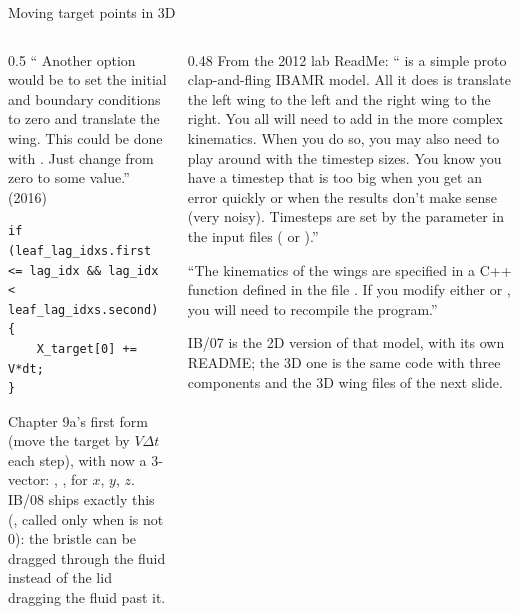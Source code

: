\documentclass[aspectratio=169,11pt]{beamer}
\begin{document}
\begin{frame}[fragile]{Moving target points in 3D}
\label{fr:targets}
\begin{columns}[T,onlytextwidth]
\begin{column}{0.5\textwidth}
\footnotesize `` Another option would be to set the initial and boundary conditions to zero and translate the wing. This could be done with . Just change  from zero to some value.'' (2016)
\begin{lstlisting}[style=cpptiny]
if (leaf_lag_idxs.first <= lag_idx && lag_idx < leaf_lag_idxs.second)
{
    X_target[0] += V*dt;
}
\end{lstlisting}
\scriptsize Chapter 9a's first form (move the target by $V\Delta t$ each step), with  now a 3-vector: \code{[0]}, \code{[1]}, \code{[2]} for $x$, $y$, $z$. IB/08 ships exactly this (, called only when  is not 0): the bristle can be dragged through the fluid instead of the lid dragging the fluid past it.
\end{column}
\begin{column}{0.48\textwidth}
\footnotesize From the 2012 lab ReadMe: ``  is a simple proto clap-and-fling IBAMR model. All it does is translate the left wing to the left and the right wing to the right. You all will need to add in the more complex kinematics. When you do so, you may also need to play around with the timestep sizes. You know you have a timestep that is too big when you get an error quickly or when the results don't make sense (very noisy). Timesteps are set by the parameter  in the input files ( or ).''
\vspace{1mm}

\footnotesize ``The kinematics of the wings are specified in a C++ function defined in the file . If you modify either  or , you will need to recompile the program.''
\vspace{1mm}

\scriptsize IB/07 is the 2D version of that model, with its own README; the 3D one is the same code with three components and the 3D wing files of the next slide.
\end{column}
\end{columns}
\end{frame}
\end{document}
